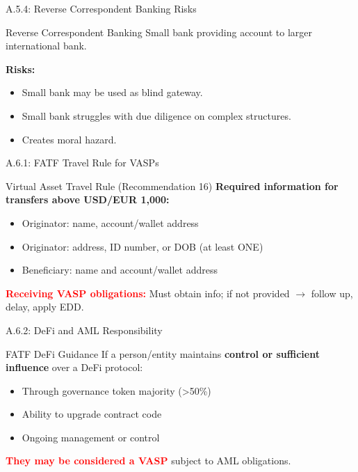 \documentclass{beamer}
\begin{document}
	\begin{frame}{A.5.4: Reverse Correspondent Banking Risks}
		\begin{block}{Reverse Correspondent Banking}
			Small bank providing account to larger international bank.
		\end{block}
		\textbf{Risks:}
		\begin{itemize}
			\item Small bank may be used as blind gateway.
			\item Small bank struggles with due diligence on complex structures.
			\item Creates moral hazard.
		\end{itemize}
	\end{frame}
	
	
	\begin{frame}{A.6.1: FATF Travel Rule for VASPs}
		\begin{block}{Virtual Asset Travel Rule (Recommendation 16)}
			\textbf{Required information for transfers above USD/EUR 1,000:}
			\begin{itemize}
				\item Originator: name, account/wallet address
				\item Originator: address, ID number, or DOB (at least ONE)
				\item Beneficiary: name and account/wallet address
			\end{itemize}
		\end{block}
		\textcolor{red}{\textbf{Receiving VASP obligations:}} Must obtain info; if not provided $\rightarrow$ follow up, delay, apply EDD.
	\end{frame}
	
	\begin{frame}{A.6.2: DeFi and AML Responsibility}
		\begin{block}{FATF DeFi Guidance}
			If a person/entity maintains \textbf{control or sufficient influence} over a DeFi protocol:
			\begin{itemize}
				\item Through governance token majority (>50\%)
				\item Ability to upgrade contract code
				\item Ongoing management or control
			\end{itemize}
			\textcolor{red}{\textbf{They may be considered a VASP}} subject to AML obligations.
		\end{block}
	\end{frame}
	
\end{document}
